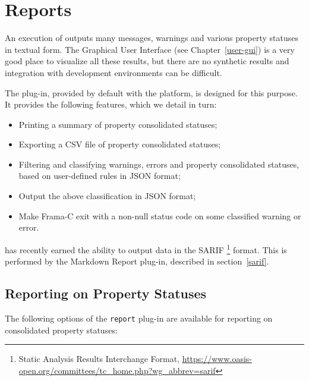
\chapter{Reports}
\label{user-report}

An execution of \FramaC outputs many messages, warnings and various property statuses in textual form.
The Graphical User Interface (see Chapter~\ref{user-gui}) is a very good place to visualize all these results,
but there are no synthetic results and integration with development environments can be difficult.

The  plug-in, provided by default with the \FramaC platform, is designed for this purpose.
It provides the following features, which we detail in turn:
\begin{itemize}
\item Printing a summary of property consolidated statuses;
\item Exporting a CSV file of property consolidated statuses;
\item Filtering and classifying warnings, errors and property consolidated statuses, based on user-defined rules in JSON format;
\item Output the above classification in JSON format;
\item Make Frama-C exit with a non-null status code on some classified warning or error.
\end{itemize}

\FramaC has recently earned the ability to output data in the SARIF%
\footnote{Static Analysis Results Interchange Format,
\url{https://www.oasis-open.org/committees/tc_home.php?wg_abbrev=sarif}} format.
This is performed by the \textsf{Markdown Report} plug-in, described in
section~\ref{sarif}.



\section{Reporting on Property Statuses}

The following options of the \texttt{report} plug-in are available for reporting on consolidated property statuses:


